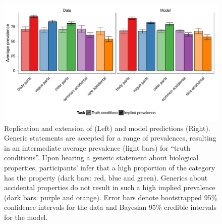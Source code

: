 \documentclass[10pt,letterpaper]{article}
\begin{document}
\begin{figure}
\centering
    \includegraphics[width=\columnwidth]{asym-data-model-2opts-phi-100k.pdf}
    \caption{Replication and extension of \protect{} (Left) and model predictions (Right). 
    Generic statements are accepted for a range of prevalences, resulting in an intermediate average prevalence (light bars) for ``truth conditions''. 
    Upon hearing a generic statement about biological properties, participants' infer that a high proportion of the category has the property (dark bars: red, blue and green). 
    Generics about accidental properties do not result in such a high implied prevalence (dark bars: purple and orange).  Error bars denote bootstrapped 95\% confidence intervals for the data and Bayesian 95\% credible intervals for the model.}
  \label{fig:exp2b}
\end{figure}


%
\end{document}
